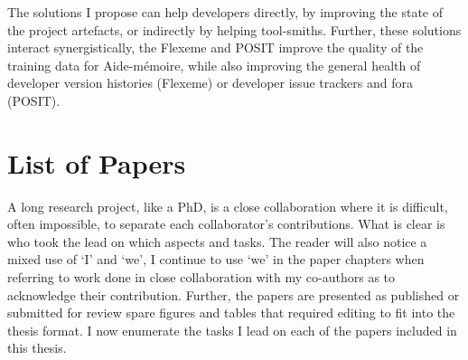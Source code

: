 The solutions I propose can help developers directly, by improving the state of
the project artefacts, or indirectly by helping tool-smiths. Further, these
solutions interact synergistically, the Flexeme and POSIT improve the quality of
the training data for Aide-mémoire, while also improving the general health of
developer version histories (Flexeme) or developer issue trackers and fora
(POSIT).

\section{List of Papers}
\label{chapter:introduction:sec:papers}


A long research project, like a PhD, is a close collaboration where it is
difficult, often impossible, to separate each collaborator's contributions. What
is clear is who took the lead on which aspects and tasks. The reader will also
notice a mixed use of `I' and `we', I continue to use `we' in the paper chapters
when referring to work done in close collaboration with my co-authors as to
acknowledge their contribution. Further, the papers are presented as published
or submitted for review spare figures and tables that required editing to fit
into the thesis format. I now enumerate the tasks I lead on each of the papers
included in this thesis.


